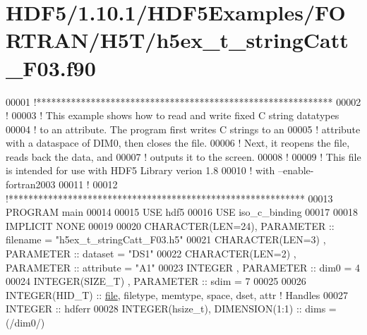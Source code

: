 \hypertarget{_h_d_f5_21_810_81_2_h_d_f5_examples_2_f_o_r_t_r_a_n_2_h5_t_2h5ex__t__string_catt___f03_8f90_source}{}\section{H\+D\+F5/1.10.1/\+H\+D\+F5\+Examples/\+F\+O\+R\+T\+R\+A\+N/\+H5\+T/h5ex\+\_\+t\+\_\+string\+Catt\+\_\+\+F03.f90}
\label{_h_d_f5_21_810_81_2_h_d_f5_examples_2_f_o_r_t_r_a_n_2_h5_t_2h5ex__t__string_catt___f03_8f90_source}

\begin{DoxyCode}
00001 \textcolor{comment}{!************************************************************}
00002 \textcolor{comment}{!}
00003 \textcolor{comment}{!  This example shows how to read and write fixed C string datatypes}
00004 \textcolor{comment}{!  to an attribute.  The program first writes C strings to an}
00005 \textcolor{comment}{!  attribute with a dataspace of DIM0, then closes the file.}
00006 \textcolor{comment}{!  Next, it reopens the file, reads back the data, and}
00007 \textcolor{comment}{!  outputs it to the screen.}
00008 \textcolor{comment}{!}
00009 \textcolor{comment}{!  This file is intended for use with HDF5 Library verion 1.8}
00010 \textcolor{comment}{!  with --enable-fortran2003 }
00011 \textcolor{comment}{!}
00012 \textcolor{comment}{!************************************************************}
00013 \textcolor{keyword}{PROGRAM} main
00014 
00015   \textcolor{keywordtype}{USE }hdf5
00016   \textcolor{keywordtype}{USE }iso\_c\_binding
00017 
00018   \textcolor{keywordtype}{IMPLICIT NONE}
00019 
00020   \textcolor{keywordtype}{CHARACTER(LEN=24)}, \textcolor{keywordtype}{PARAMETER} :: filename  = \textcolor{stringliteral}{"h5ex\_t\_stringCatt\_F03.h5"}
00021   \textcolor{keywordtype}{CHARACTER(LEN=3)} , \textcolor{keywordtype}{PARAMETER} :: dataset   = \textcolor{stringliteral}{"DS1"}
00022   \textcolor{keywordtype}{CHARACTER(LEN=2)} , \textcolor{keywordtype}{PARAMETER} :: attribute = \textcolor{stringliteral}{"A1"}
00023   \textcolor{keywordtype}{INTEGER}          , \textcolor{keywordtype}{PARAMETER} :: dim0      = 4
00024   \textcolor{keywordtype}{INTEGER(SIZE\_T)}  , \textcolor{keywordtype}{PARAMETER} :: sdim      = 7
00025 
00026   \textcolor{keywordtype}{INTEGER(HID\_T)}  :: \hyperlink{structfile}{file}, filetype, memtype, space, dset, attr \textcolor{comment}{! Handles}
00027   \textcolor{keywordtype}{INTEGER} :: hdferr
00028   \textcolor{keywordtype}{INTEGER(hsize\_t)}, \textcolor{keywordtype}{DIMENSION(1:1)} :: dims = (/dim0/)

\end{DoxyCode}
